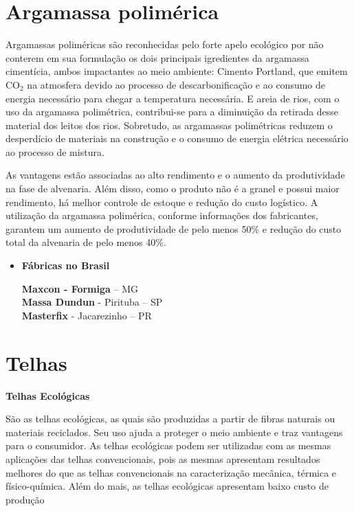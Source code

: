 \section{Argamassa polimérica}

	Argamassas poliméricas são reconhecidas pelo forte apelo ecológico por não conterem em sua formulação os dois principais igredientes da argamassa cimentícia, ambos impactantes ao meio ambiente: Cimento Portland, que emitem CO$_2$ na atmosfera devido ao processo de descarbonificação e ao consumo de energia necessário para chegar a temperatura necessária. E areia de rios, com o uso da argamassa polimétrica, contribui-se para a diminuição da retirada desse material dos leitos dos rios. Sobretudo, as argamassas polimétricas reduzem o desperdício de materiais na construção e o consumo de energia elétrica necessário ao processo de mistura.\cite{Angulo2000}\cite{Portland1980}
	
	As vantagens estão associadas ao alto rendimento e o aumento da produtividade na fase de alvenaria. Além disso, como o produto não é a granel e possui maior rendimento, há melhor controle de estoque e redução do custo logístico. A utilização da argamassa polimérica, conforme informações dos fabricantes, garantem um aumento de produtividade de pelo menos 50\% e redução do custo total da alvenaria de pelo menos 40\%.

\begin{itemize}
\item \textbf{Fábricas no Brasil}

\textbf{Maxcon - Formiga} – MG\\
\textbf{Massa Dundun} - Pirituba – SP\\
\textbf{Masterfix} - Jacarezinho – PR
\end{itemize}

\section{Telhas}

\textbf{Telhas Ecológicas}

	São as telhas ecológicas, as quais são produzidas a partir de fibras naturais ou materiais reciclados. Seu uso ajuda a proteger o meio ambiente e traz vantagens para o consumidor. As telhas ecológicas podem ser utilizadas com as mesmas aplicações das telhas convencionais, pois as mesmas apresentam resultados melhores do que as telhas convencionais na caracterização mecânica, térmica e físico-química. Além do mais, as telhas ecológicas apresentam baixo custo de produção\\

